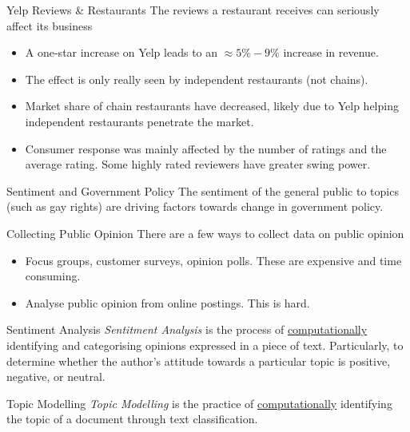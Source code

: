 \documentclass[11pt,a4paper]{article}
\begin{document}
\begin{proposition}{Yelp Reviews \& Restaurants}
  The reviews a restaurant receives can seriously affect its business
  \begin{itemize}
    \item A one-star increase on Yelp leads to an $\approx5\%-9\%$ increase in revenue.
    \item The effect is only really seen by independent restaurants (not chains).
    \item Market share of chain restaurants have decreased, likely due to Yelp helping independent restaurants penetrate the market.
    \item Consumer response was mainly affected by the number of ratings and the average rating. Some highly rated reviewers have greater swing power.
  \end{itemize}
\end{proposition}

\begin{remark}{Sentiment and Government Policy}
  The sentiment of the general public to topics (such as gay rights) are driving factors towards change in government policy.
\end{remark}

\begin{proposition}{Collecting Public Opinion}
  There are a few ways to collect data on public opinion
  \begin{itemize}
    \item[\textit{Traditional}] Focus groups, customer surveys, opinion polls. These are expensive and time consuming.
    \item[\textit{Sentiment Analysis}] Analyse public opinion from online postings. This is hard.
  \end{itemize}
\end{proposition}

\begin{definition}{Sentiment Analysis}
  \textit{Sentitment Analysis} is the process of \underline{computationally} identifying and categorising opinions expressed in a piece of text. Particularly, to determine whether the author's attitude towards a particular topic is positive, negative, or neutral.
\end{definition}

\begin{definition}{Topic Modelling}
  \textit{Topic Modelling} is the practice of \underline{computationally} identifying the topic of a document through text classification.
\end{definition}
\end{document}
